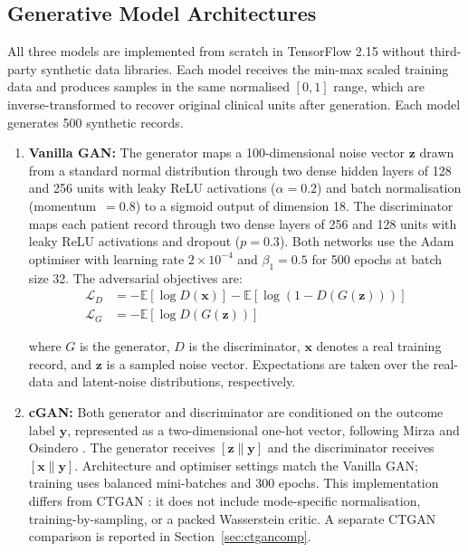 \documentclass[journal]{IEEEtran}
\begin{document}
\subsection{Generative Model Architectures}

All three models are implemented from scratch in TensorFlow 2.15 without third-party synthetic data libraries. Each model receives the min-max scaled training data and produces samples in the same normalised $[0, 1]$ range, which are inverse-transformed to recover original clinical units after generation. Each model generates 500 synthetic records.

\begin{enumerate}
  \item {\textbf {Vanilla GAN:}} The generator maps a 100-dimensional noise vector $\mathbf{z}$ drawn from a standard normal distribution through two dense hidden layers of 128 and 256 units with leaky ReLU activations ($\alpha = 0.2$) and batch normalisation (momentum~$= 0.8$) to a sigmoid output of dimension 18. The discriminator maps each patient record through two dense layers of 256 and 128 units with leaky ReLU activations and dropout ($p = 0.3$). Both networks use the Adam optimiser with learning rate $2 \times 10^{-4}$ and $\beta_1 = 0.5$ for 500 epochs at batch size 32. The adversarial objectives are:
\begin{align}
\mathcal{L}_D &= -\mathbb{E}[\log D(\mathbf{x})] - \mathbb{E}[\log(1 - D(G(\mathbf{z})))] \\
\mathcal{L}_G &= -\mathbb{E}[\log D(G(\mathbf{z}))]
\end{align}

where $G$ is the generator, $D$ is the discriminator, $\mathbf{x}$ denotes a real training record, and $\mathbf{z}$ is a sampled noise vector. Expectations are taken over the real-data and latent-noise distributions, respectively.

\item {\textbf {cGAN:}} Both generator and discriminator are conditioned on the outcome label $\mathbf{y}$, represented as a two-dimensional one-hot vector, following Mirza and Osindero \cite{mirza2014}. The generator receives $[\mathbf{z}\|\mathbf{y}]$ and the discriminator receives $[\mathbf{x}\|\mathbf{y}]$. Architecture and optimiser settings match the Vanilla GAN; training uses balanced mini-batches and 300 epochs. This implementation differs from CTGAN \cite{xu2019}: it does not include mode-specific normalisation, training-by-sampling, or a packed Wasserstein critic. A separate CTGAN comparison is reported in Section~\ref{sec:ctgancomp}.


\end{enumerate}
\end{document}

